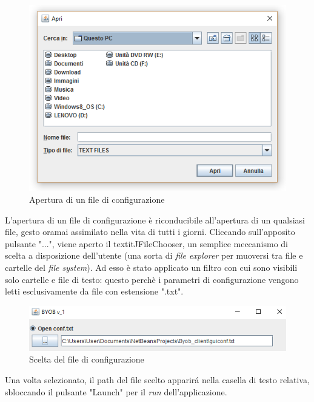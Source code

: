 \begin{figure}[!htb]
        \centering
		\includegraphics[width=0.6\linewidth]{./imgs/scelta1}
        \caption{Apertura di un file di configurazione}
        \label{apertura}
\end{figure}
L'apertura di un file di configurazione \`e riconducibile all'apertura di un qualsiasi file, gesto oramai assimilato nella vita di tutti i giorni. Cliccando sull'apposito pulsante "...", viene aperto il textit{JFileChooser}, un semplice meccanismo di scelta a disposizione dell'utente (una sorta di \textit{file explorer} per muoversi tra file e cartelle del \textit{file system}). Ad esso \`e stato applicato un filtro con cui sono visibili solo cartelle e file di testo: questo perch\`e i parametri di configurazione vengono letti esclusivamente da file con estensione ".txt".\\

\begin{figure}[!htb]
        \centering
		\includegraphics[width=0.7\linewidth]{./imgs/scelta11}
        \caption{Scelta del file di configurazione}
        \label{scelta}
\end{figure}
Una volta selezionato, il path del file scelto apparir\'a nella casella di testo relativa, sbloccando il pulsante "Launch" per il \textit{run} dell'applicazione.

